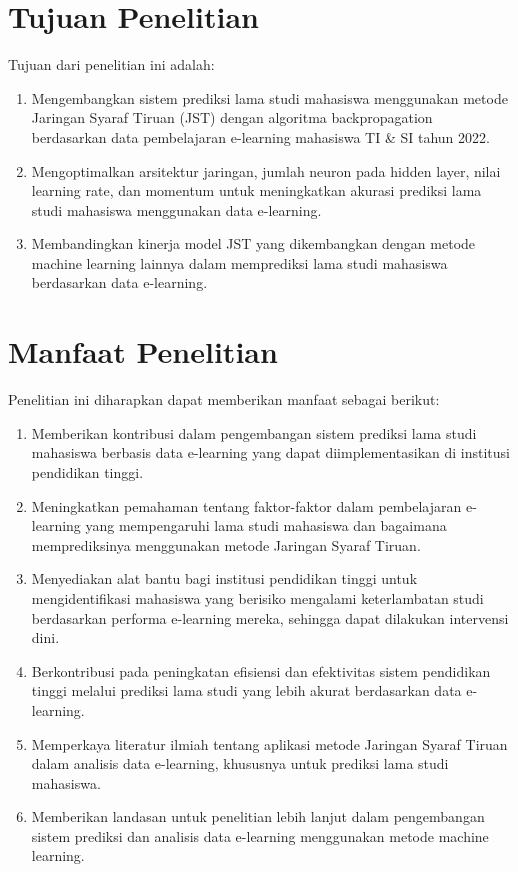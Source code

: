 \section{Tujuan Penelitian}
Tujuan dari penelitian ini adalah:
    \begin{enumerate}
        \item Mengembangkan sistem prediksi lama studi mahasiswa menggunakan metode Jaringan Syaraf Tiruan (JST) dengan algoritma backpropagation berdasarkan data pembelajaran e-learning mahasiswa TI & SI tahun 2022.
        \item Mengoptimalkan arsitektur jaringan, jumlah neuron pada hidden layer, nilai learning rate, dan momentum untuk meningkatkan akurasi prediksi lama studi mahasiswa menggunakan data e-learning.
        \item Membandingkan kinerja model JST yang dikembangkan dengan metode machine learning lainnya dalam memprediksi lama studi mahasiswa berdasarkan data e-learning.
    \end{enumerate}

\section{Manfaat Penelitian}
Penelitian ini diharapkan dapat memberikan manfaat sebagai berikut:

    \begin{enumerate}
        \item Memberikan kontribusi dalam pengembangan sistem prediksi lama studi mahasiswa berbasis data e-learning yang dapat diimplementasikan di institusi pendidikan tinggi.
        \item Meningkatkan pemahaman tentang faktor-faktor dalam pembelajaran e-learning yang mempengaruhi lama studi mahasiswa dan bagaimana memprediksinya menggunakan metode Jaringan Syaraf Tiruan.
        \item Menyediakan alat bantu bagi institusi pendidikan tinggi untuk mengidentifikasi mahasiswa yang berisiko mengalami keterlambatan studi berdasarkan performa e-learning mereka, sehingga dapat dilakukan intervensi dini.
        \item Berkontribusi pada peningkatan efisiensi dan efektivitas sistem pendidikan tinggi melalui prediksi lama studi yang lebih akurat berdasarkan data e-learning.
        \item Memperkaya literatur ilmiah tentang aplikasi metode Jaringan Syaraf Tiruan dalam analisis data e-learning, khususnya untuk prediksi lama studi mahasiswa.
        \item Memberikan landasan untuk penelitian lebih lanjut dalam pengembangan sistem prediksi dan analisis data e-learning menggunakan metode machine learning.
    \end{enumerate}

